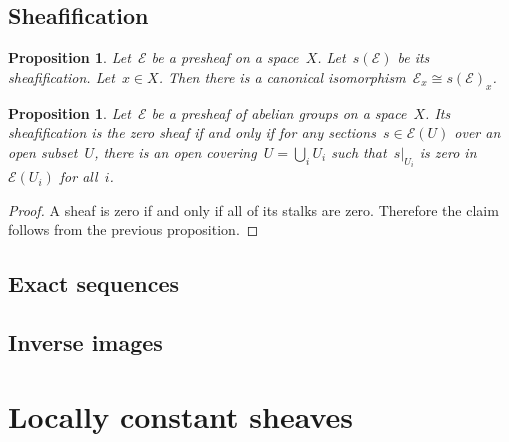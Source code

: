 \documentclass[10pt]{amsart}
\theoremstyle{definition}
\theoremstyle{plain}
\newtheorem{prop}[defn]{Proposition}
\theoremstyle{remark}
\newcommand{\E}{\mathcal{E}}
\begin{document}
\subsection{Sheafification}

\begin{prop}Let~$\E$ be a presheaf on a space~$X$. Let~$s(\E)$ be its
sheafification. Let~$x \in X$. Then there is a canonical isomorphism~$\E_x
\cong s(\E)_x$.\end{prop}

\begin{prop}\label{prop:sheafification-zero}
Let~$\E$ be a presheaf of abelian groups on a space~$X$. Its
sheafification is the zero sheaf if and only if for any sections~$s \in \E(U)$
over an open subset~$U$, there is an open covering~$U = \bigcup_i U_i$ such
that~$s|_{U_i}$ is zero in~$\E(U_i)$ for all~$i$.\end{prop}

\begin{proof}A sheaf is zero if and only if all of its stalks are zero.
Therefore the claim follows from the previous proposition.
\end{proof}


\subsection{Exact sequences}

\subsection{Inverse images}




\section{Locally constant sheaves}
\end{document}
